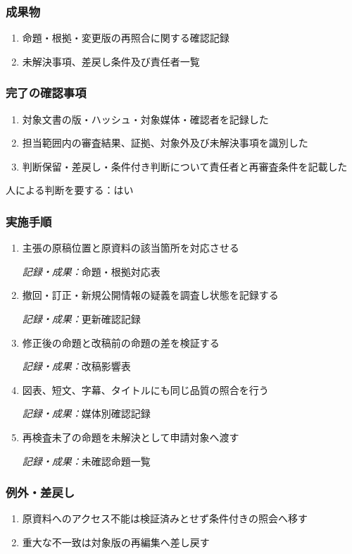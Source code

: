 \documentclass[a4paper,11pt]{article}
\begin{document}
\subsubsection*{成果物}
\begin{enumerate}[leftmargin=2em,itemsep=0.35em]
\item 命題・根拠・変更版の再照合に関する確認記録
\item 未解決事項、差戻し条件及び責任者一覧
\end{enumerate}
\subsubsection*{完了の確認事項}
\begin{enumerate}[leftmargin=2em,itemsep=0.35em]
\item 対象文書の版・ハッシュ・対象媒体・確認者を記録した
\item 担当範囲内の審査結果、証拠、対象外及び未解決事項を識別した
\item 判断保留・差戻し・条件付き判断について責任者と再審査条件を記載した
\end{enumerate}
\par 人による判断を要する：はい\par\medskip
\subsubsection*{実施手順}
\begin{enumerate}[leftmargin=2em,itemsep=0.65em]
\item 主張の原稿位置と原資料の該当箇所を対応させる\par\noindent\textit{記録・成果：}命題・根拠対応表\nobreak\smallskip
\item 撤回・訂正・新規公開情報の疑義を調査し状態を記録する\par\noindent\textit{記録・成果：}更新確認記録\nobreak\smallskip
\item 修正後の命題と改稿前の命題の差を検証する\par\noindent\textit{記録・成果：}改稿影響表\nobreak\smallskip
\item 図表、短文、字幕、タイトルにも同じ品質の照合を行う\par\noindent\textit{記録・成果：}媒体別確認記録\nobreak\smallskip
\item 再検査未了の命題を未解決として申請対象へ渡す\par\noindent\textit{記録・成果：}未確認命題一覧\nobreak\smallskip
\end{enumerate}
\subsubsection*{例外・差戻し}
\begin{enumerate}[leftmargin=2em,itemsep=0.35em]
\item 原資料へのアクセス不能は検証済みとせず条件付きの照会へ移す
\item 重大な不一致は対象版の再編集へ差し戻す
\end{enumerate}
\end{document}
